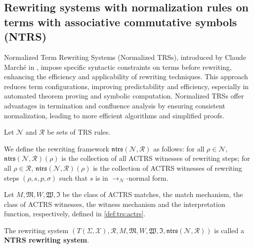 

\subsection{Rewriting systems with normalization rules on terms with associative commutative symbols (NTRS)}

Normalized Term Rewriting Systems (Normalized TRSs), introduced by Claude Marché in \cite{marche1996normalized}, impose specific syntactic constraints on terms before rewriting, enhancing the efficiency and applicability of rewriting techniques. This approach reduces term configurations, improving predictability and efficiency, especially in automated theorem proving and symbolic computation. Normalized TRSs offer advantages in termination and confluence analysis by ensuring consistent normalization, leading to more efficient algorithms and simplified proofs. 


\begin{definition}
  Let $\mathcal{N}$ and $\mathcal{R}$ be sets of TRS rules.

  We define the rewriting framework $\mathfrak{ntrs}(\mathcal{N},\mathcal{R})$ as follows: for all $\rho \in \mathcal{N}$, $\mathfrak{ntrs}(\mathcal{N},\mathcal{R})(\rho)$ is the collection of all ACTRS witnesses of rewriting steps; for all $\rho \in \mathcal{R}$, $\mathfrak{ntrs}(\mathcal{N},\mathcal{R})(\rho)$ is the collection of ACTRS witnesses of rewriting steps $(\rho, s, p, \sigma)$ such that $s$ is in $\to_\mathcal{N}$-normal form.

  Let $M, \mathfrak{M}, W, \mathfrak{W}, \mathfrak{I}$ be the class of ACTRS matches, the match mechanism, the class of ACTRS witnesses, the witness mechanism and the interpretation function, respectively, defined in \autoref{def:trs:actrs}.

  The rewriting system $(T(\Sigma,\mathcal{X}), \mathcal{R}, M, \mathfrak{M}, W, \mathfrak{W}, \mathfrak{I}, \mathfrak{ntrs}(\mathcal{N},\mathcal{R}))$ is called a \textbf{NTRS rewriting system}.
\end{definition}


